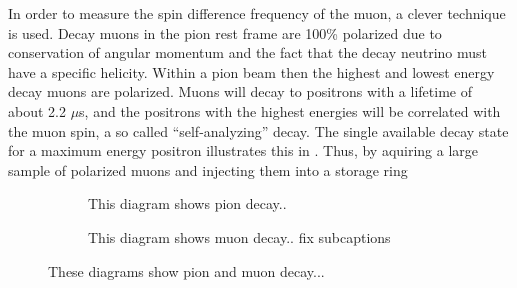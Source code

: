 In order to measure the spin difference frequency of the muon, a clever technique is used. Decay muons in the pion rest frame are 100\% polarized due to conservation of angular momentum and the fact that the decay neutrino must have a specific helicity. Within a pion beam then the highest and lowest energy decay muons are polarized. Muons will decay to positrons with a lifetime of about 2.2 $\mu$s, and the positrons with the highest energies will be correlated with the muon spin, a so called ``self-analyzing'' decay. The single available decay state for a maximum energy positron illustrates this in . Thus, by aquiring a large sample of polarized muons and injecting them into a storage ring 



\begin{figure}[]
\centering
    \begin{subfigure}[]{0.4\textwidth}
    \centering
    \caption{This diagram shows pion decay..}
    \end{subfigure}
    \hspace{10mm}
    \begin{subfigure}[]{0.4\textwidth}
    \centering
    \caption{This diagram shows muon decay.. fix subcaptions}
    \end{subfigure}


\caption[Decay Diagrams]{These diagrams show pion and muon decay...}    
\label{fig:DecayDiagrams}
\end{figure}




